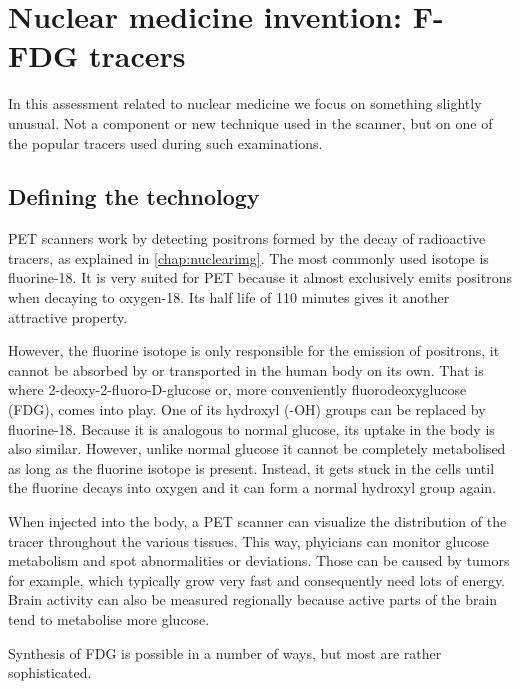 \section{Nuclear medicine invention: F-FDG tracers}
In this assessment related to nuclear medicine we focus on something slightly
unusual. Not a component or new technique used in the scanner, but on one of the
popular tracers used during such examinations.

\subsection{Defining the technology}
PET scanners work by detecting positrons formed by the decay of radioactive
tracers, as explained in \autoref{chap:nuclearimg}. The most commonly used
isotope is fluorine-18. It is very suited for PET because it almost exclusively
emits positrons when decaying to oxygen-18. Its half life of 110 minutes gives
it another attractive property.


However, the fluorine isotope is only responsible for the emission of positrons,
it cannot be absorbed by or transported in the human body on its own. That is
where 2-deoxy-2-fluoro-D-glucose or, more conveniently fluorodeoxyglucose (FDG),
comes into play. One of its hydroxyl (-OH) groups can be replaced by
fluorine-18. Because it is analogous to normal glucose, its uptake in the body
is also similar. However, unlike normal glucose it cannot be completely
metabolised as long as the fluorine isotope is present. Instead, it gets stuck
in the cells until the fluorine decays into oxygen and it can form a normal
hydroxyl group again.

When injected into the body, a PET scanner can visualize the distribution of the
tracer throughout the various tissues. This way, phyicians can monitor glucose
metabolism and spot abnormalities or deviations. Those can be caused by tumors
for example, which typically grow very fast and consequently need lots of
energy. Brain activity can also be measured regionally because active parts of
the brain tend to metabolise more glucose.

Synthesis of FDG is possible in a number of ways, but most are rather
sophisticated. 



